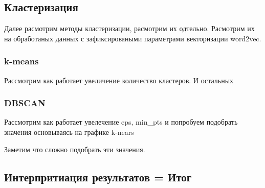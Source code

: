 	
	\subsection{Кластеризация}
		Далее расмотрим методы кластеризации, расмотрим их одтельно. Расмотрим их на обработаных данных с зафиксироваными параметрами векторизации word2vec. 
		
		\subsubsection{k-means}
			Рассмотрим как работает увеличение количество кластеров. И остальных
		
		\subsubsection{DBSCAN}
			Рассмотрим как работает увелечение eps, min\_pts и попробуем подобрать значения основываясь на графике k-nears
			
			Заметим что сложно подобрать эти значения.
	
	\subsection{Интерпритиация результатов = Итог}
		
		
		

